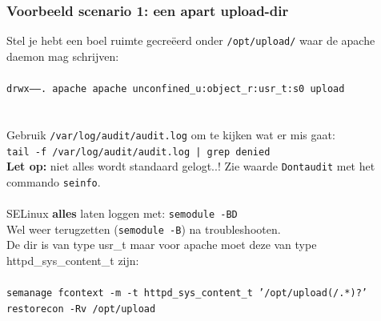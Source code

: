 %

\begin{frame}
    \frametitle{Voorbeeld scenario 1: een apart upload-dir}
Stel je hebt een boel ruimte gecre{\"e}erd onder {\tt /opt/upload/} waar de apache daemon mag schrijven: \\
~\\
\tiny
{\tt drwx------. apache apache unconfined\_u:object\_r:usr\_t:s0 upload} \\
\pause
~\\
~\\
\small
Gebruik {\tt /var/log/audit/audit.log} om te kijken wat er mis gaat: \\
{\tt tail -f /var/log/audit/audit.log | grep denied} \\
{\bf Let op:} niet alles wordt standaard gelogt..! Zie waarde {\tt Dontaudit} met het commando {\tt seinfo}. \\
~\\
SELinux {\bf alles} laten loggen met: {\tt semodule -BD} \\
Wel weer terugzetten ({\tt semodule -B}) na troubleshooten. \\
\pause
De dir is van type usr\_t maar voor apache moet deze van type httpd\_sys\_content\_t zijn: \\
~\\
\tiny
{\tt semanage fcontext -m -t httpd\_sys\_content\_t '/opt/upload(/.*)?'} \\
{\tt restorecon -Rv /opt/upload}
\end{frame}


